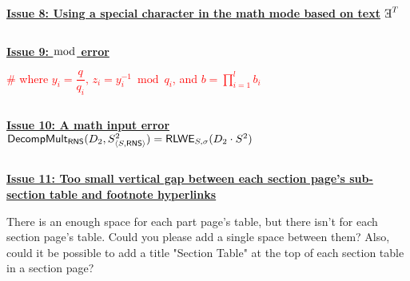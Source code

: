 $ $

\underline{\textbf{Issue 8: Using a special character in the math mode based on text}}
$\text{\rotatecharone{E}}^{T}$

$ $

\underline{\textbf{Issue 9: $\bmod$ error}}

\textcolor{red}{ \# where $y_i = \dfrac{q}{q_i} \text{, } z_i = y_i^{-1} \bmod q_i$, and $b = \prod\limits_{i=1}^lb_i$}

$ $

\underline{\textbf{Issue 10: A math input error}}
$\textsf{DecompMult\textsubscript{RNS}}(D_2, S^2_{\langle S, \textsf{RNS}\rangle}) = \textsf{RLWE}_{S, \sigma}(D_2 \cdot S^2) $

$ $

\underline{\textbf{Issue 11: Too small vertical gap between each section page's sub-section table and footnote hyperlinks}}

There is an enough space for each part page's table, but there isn't for each section page's table. Could you please add a single space between them? Also, could it be possible to add a title "Section Table" at the top of each section table in a section page?
